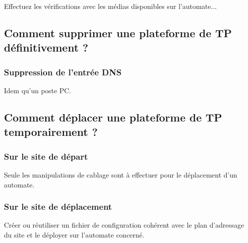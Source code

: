 \documentclass[a4paper]{article}
\begin{document}
Effectuez les vérifications avec les médias disponibles sur l'automate...

\subsection{Comment supprimer une plateforme de TP définitivement ?}

\subsubsection{Suppression de l'entrée DNS}	

Idem qu'un poste PC.

\subsection{Comment déplacer une plateforme de TP temporairement ?}

\subsubsection{Sur le site de départ}

Seule les manipulations de cablage sont à effectuer pour le déplacement d'un automate.

\subsubsection{Sur le site de déplacement}

Créer ou réutiliser un fichier de configuration cohérent avec le plan d'adressage du site et le déployer sur l'automate concerné.
\end{document}
